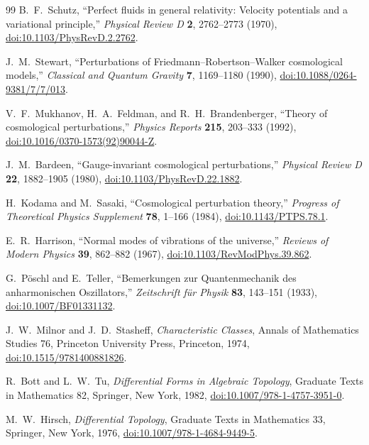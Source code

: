 \documentclass[11pt]{article}
\theoremstyle{canonmath}
\theoremstyle{canonpostulate}
\theoremstyle{canonproposition}
\theoremstyle{canonmath}
\theoremstyle{canonproposition}
\begin{document}
\begin{thebibliography}{99}
B.~F.~Schutz, ``Perfect fluids in general relativity: Velocity potentials and a variational principle,'' \textit{Physical Review D} \textbf{2}, 2762--2773 (1970), \href{https://doi.org/10.1103/PhysRevD.2.2762}{doi:10.1103/PhysRevD.2.2762}.

J.~M.~Stewart, ``Perturbations of Friedmann--Robertson--Walker cosmological models,'' \textit{Classical and Quantum Gravity} \textbf{7}, 1169--1180 (1990), \href{https://doi.org/10.1088/0264-9381/7/7/013}{doi:10.1088/0264-9381/7/7/013}.

V.~F.~Mukhanov, H.~A.~Feldman, and R.~H.~Brandenberger, ``Theory of cosmological perturbations,'' \textit{Physics Reports} \textbf{215}, 203--333 (1992), \href{https://doi.org/10.1016/0370-1573(92)90044-Z}{doi:10.1016/0370-1573(92)90044-Z}.

J.~M.~Bardeen, ``Gauge-invariant cosmological perturbations,'' \textit{Physical Review D} \textbf{22}, 1882--1905 (1980), \href{https://doi.org/10.1103/PhysRevD.22.1882}{doi:10.1103/PhysRevD.22.1882}.

H.~Kodama and M.~Sasaki, ``Cosmological perturbation theory,'' \textit{Progress of Theoretical Physics Supplement} \textbf{78}, 1--166 (1984), \href{https://doi.org/10.1143/PTPS.78.1}{doi:10.1143/PTPS.78.1}.

E.~R.~Harrison, ``Normal modes of vibrations of the universe,'' \textit{Reviews of Modern Physics} \textbf{39}, 862--882 (1967), \href{https://doi.org/10.1103/RevModPhys.39.862}{doi:10.1103/RevModPhys.39.862}.

G.~Pöschl and E.~Teller, ``Bemerkungen zur Quantenmechanik des anharmonischen Oszillators,'' \textit{Zeitschrift für Physik} \textbf{83}, 143--151 (1933), \href{https://doi.org/10.1007/BF01331132}{doi:10.1007/BF01331132}.

J.~W.~Milnor and J.~D.~Stasheff, \textit{Characteristic Classes}, Annals of Mathematics Studies 76, Princeton University Press, Princeton, 1974, \href{https://doi.org/10.1515/9781400881826}{doi:10.1515/9781400881826}.

R.~Bott and L.~W.~Tu, \textit{Differential Forms in Algebraic Topology}, Graduate Texts in Mathematics 82, Springer, New York, 1982, \href{https://doi.org/10.1007/978-1-4757-3951-0}{doi:10.1007/978-1-4757-3951-0}.

M.~W.~Hirsch, \textit{Differential Topology}, Graduate Texts in Mathematics 33, Springer, New York, 1976, \href{https://doi.org/10.1007/978-1-4684-9449-5}{doi:10.1007/978-1-4684-9449-5}.


\end{thebibliography}
\end{document}
